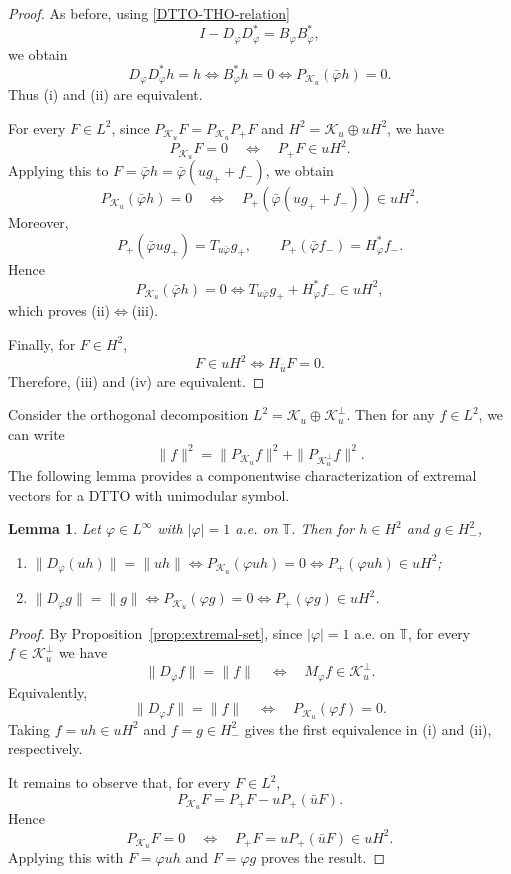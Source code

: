 \documentclass[12pt]{amsart}
\newtheorem{lemma}[theorem]{Lemma}
\theoremstyle{definition}
\theoremstyle{remark}
\def \T{\mathbb{T}}
\newcommand{\clk}{\mathcal{K}}
\newcommand{\vp}{\varphi}
\numberwithin{equation}{section}
\begin{document}
\begin{proof}
As before, using \eqref{DTTO-THO-relation}
\[
I-D_\vp D_\vp^*=B_\vp B_\vp^*,
\]
we obtain
\[
D_\vp D_\vp^*h=h \iff B_\vp^*h=0\iff P_{\clk_u}(\bar{\vp} h)=0.
\]
Thus \textup{(i)} and \textup{(ii)} are equivalent.
	

For every $F\in L^2$, since $P_{\clk_u}F=P_{\clk_u}P_{+}F$ and
$H^2=\clk_u\oplus uH^2$, we have
\[
P_{\clk_u}F=0
\quad\Longleftrightarrow\quad
P_{+}F\in uH^2.
\]
Applying this to $F=\bar{\vp}h=\bar{\vp}(ug_{+}+f_{-})$, we obtain
\[
P_{\clk_u}(\bar{\vp}h)=0
\quad\Longleftrightarrow\quad
P_{+}\left(\bar{\vp}(ug_{+}+f_{-})\right)\in uH^2.
\]
Moreover,
\[
P_{+}(\bar{\vp}ug_{+})=T_{u\bar{\vp}}g_{+}, \qquad P_{+}(\bar{\vp} f_{-})=H_\vp^*f_{-}.
\]
Hence
\[
P_{\clk_u}(\bar{\vp} h)=0 \iff T_{u\bar{\vp}}g_{+} + H_\vp^*f_{-}\in uH^2,
\]
which proves \textup{(ii)}$\iff$\textup{(iii)}.
	
Finally, for $F\in H^2$,
\[
F\in uH^2\iff H_{\bar u}F=0.
\]
Therefore, \textup{(iii)} and \textup{(iv)} are equivalent.
\end{proof}













Consider the orthogonal decomposition $L^2=\clk_u \oplus \clk_u^\perp$. Then for any  $f\in L^2$, we can write
\begin{equation}\label{eq:key-relations}
\|f\|^2=\|P_{\clk_u}f\|^2+\|P_{\clk_u^\perp}f\|^2.
\end{equation}
The following lemma provides a componentwise characterization of
extremal vectors for a DTTO with unimodular symbol.

\begin{lemma}\label{lem:proj-id}
Let $\vp\in L^\infty$ with $|\vp|=1$ a.e. on $\T$. Then for $h\in H^2$ and $g\in H^2_{-}$,
\begin{enumerate}
\item $	\|D_\vp(uh)\|=\|uh\| \iff P_{\clk_u}(\vp uh)=0
\iff P_{+}(\vp uh)\in uH^2$;

\item $\|D_\vp g\|=\|g\| \iff P_{\clk_u}(\vp g)=0
\iff P_{+}(\vp g)\in uH^2$.
\end{enumerate}
\end{lemma}

\begin{proof}
By Proposition~\ref{prop:extremal-set}, since $|\vp|=1$ a.e. on $\T$,
for every $f\in\clk_u^\perp$ we have
\[
\|D_\vp f\|=\|f\| \quad\Longleftrightarrow\quad
M_\vp f\in\clk_u^\perp.
\]
Equivalently,
\[
\|D_\vp f\|=\|f\|
\quad\Longleftrightarrow\quad
P_{\clk_u}(\vp f)=0.
\]
Taking $f=uh\in uH^2$ and $f=g\in H^2_{-}$ gives the first equivalence in \textup{(i)} and \textup{(ii)}, respectively.
	
It remains to observe that, for every $F\in L^2$,
\[
P_{\clk_u}F=P_{+}F-uP_{+}(\bar{u} F).
\]
Hence
\[
P_{\clk_u}F=0
\quad\Longleftrightarrow\quad
P_{+}F=uP_{+}(\bar{u} F)\in uH^2.
\]
Applying this with $F=\vp uh$ and $F=\vp g$ proves the result.
\end{proof}
\end{document}
